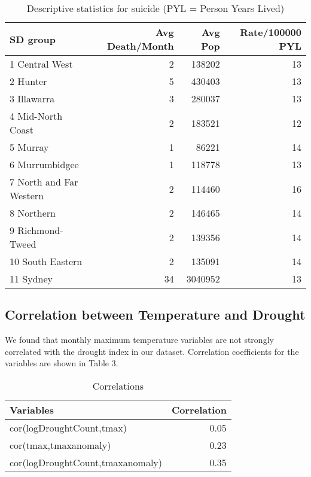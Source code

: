\documentclass[a4paper]{article}                %
\begin{document}
        \begin{table}[!ht]
        \begin{center}
        \caption{Descriptive statistics for suicide (PYL = Person Years Lived)}
        \label{tab:tab2}
        \begin{tabular}{lrrr}
        \hline
        SD group & Avg Death/Month & Avg Pop & Rate/100000 PYL \\
        \hline
        1 Central West & 2 & 138202 & 13 \\
        2 Hunter & 5 & 430403 & 13 \\
        3 Illawarra & 3 & 280037 & 13 \\
        4 Mid-North Coast & 2 & 183521 & 12 \\
        5 Murray & 1 & 86221 & 14 \\
        6 Murrumbidgee & 1 & 118778 & 13 \\
        7 North and Far Western & 2 & 114460 & 16 \\
        8 Northern & 2 & 146465 & 14 \\
        9 Richmond-Tweed & 2 & 139356 & 14 \\
        10 South Eastern & 2 & 135091 & 14 \\
        11 Sydney & 34 & 3040952 & 13 \\
        \hline
        \end{tabular}
        \end{center}
        \end{table}

\clearpage

\subsection{Correlation between Temperature and Drought}

 We found that monthly maximum temperature variables are not strongly correlated with the drought index in our dataset.  Correlation coefficients for the variables are shown in Table 3.



\begin{table}[ht]
\begin{center}
\caption{Correlations}
\label{tab:Correlations}
\begin{tabular}{lr}
  \hline
Variables & Correlation \\ 
  \hline
cor(logDroughtCount,tmax) & 0.05 \\ 
  cor(tmax,tmaxanomaly) & 0.23 \\ 
  cor(logDroughtCount,tmaxanomaly) & 0.35 \\ 
   \hline
\end{tabular}
\end{center}
\end{table}
\end{document}
